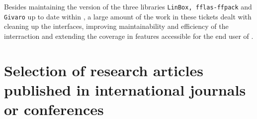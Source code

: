 \documentclass{deliverablereport}
\begin{document}
Besides maintaining the version of the three libraries \texttt{LinBox,
  fflas-ffpack} and \texttt{Givaro} up to date within \Sage, a large amount of
the work in these tickets dealt with cleaning up the interfaces, improving
maintainability and efficiency of the interraction and extending the coverage in
features accessible for the end user of \Sage.
\renewcommand\refname{List of publications delivered}



\appendix

\section{Selection of research articles published in international journals or conferences}
\label{app:papers}





\end{document}
